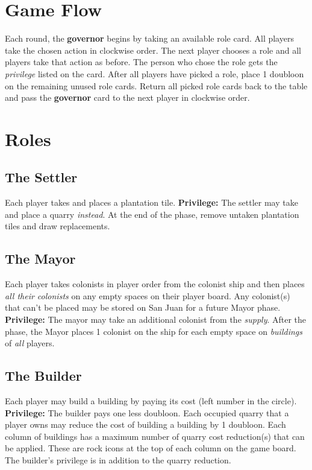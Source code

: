\documentclass[12pt]{article}
\begin{document}
\begin{mdframed}[style = customFrame]
\begin{multicols*}{2}
\section*{Game Flow}
Each round, the \textbf{governor} begins by taking an available role card. All players take the chosen action in clockwise order. The next player chooses a role and all players take that action as before. The person who chose the role gets the \emph{privilege} listed on the card. After all players have picked a role, place 1 doubloon on the remaining unused role cards. Return all picked role cards back to the table and pass the \textbf{governor} card to the next player in clockwise order.

\section*{Roles}
\subsection*{The Settler}
Each player takes and places a plantation tile. \textbf{Privilege:} The settler may take and place a quarry \emph{instead}. At the end of the phase, remove untaken plantation tiles and draw replacements.

\subsection*{The Mayor}
Each player takes colonists in player order from the colonist ship and then places \emph{all their colonists} on any empty spaces on their player board. Any colonist(s) that can't be placed may be stored on San Juan for a future Mayor phase. \textbf{Privilege:} The mayor may take an additional colonist from the \emph{supply}. After the phase, the Mayor places 1 colonist on the ship for each empty space on \emph{buildings} of \emph{all} players.

\subsection*{The Builder}
Each player may build a building by paying its cost (left number in the circle). \textbf{Privilege:} The builder pays one less doubloon. Each occupied quarry that a player owns may reduce the cost of building a building by 1 doubloon. Each column of buildings has a maximum number of quarry cost reduction(s) that can be applied. These are rock icons at the top of each column on the game board. The builder's privilege is in addition to the quarry reduction.


\end{multicols*}
\end{mdframed}
\end{document}
